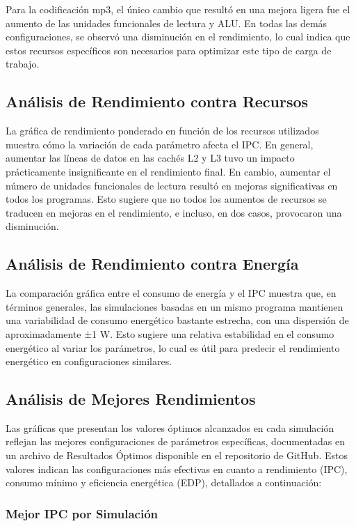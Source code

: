 \documentclass[conference]{IEEEtran}
\begin{document}
Para la codificación mp3, el único cambio que resultó en una mejora ligera fue el aumento de las unidades funcionales de lectura y ALU. En todas las demás configuraciones, se observó una disminución en el rendimiento, lo cual indica que estos recursos específicos son necesarios para optimizar este tipo de carga de trabajo.

\subsection{Análisis de Rendimiento contra Recursos}

La gráfica de rendimiento ponderado en función de los recursos utilizados muestra cómo la variación de cada parámetro afecta el IPC. En general, aumentar las líneas de datos en las cachés L2 y L3 tuvo un impacto prácticamente insignificante en el rendimiento final. En cambio, aumentar el número de unidades funcionales de lectura resultó en mejoras significativas en todos los programas. Esto sugiere que no todos los aumentos de recursos se traducen en mejoras en el rendimiento, e incluso, en dos casos, provocaron una disminución.

\subsection{Análisis de Rendimiento contra Energía}

La comparación gráfica entre el consumo de energía y el IPC muestra que, en términos generales, las simulaciones basadas en un mismo programa mantienen una variabilidad de consumo energético bastante estrecha, con una dispersión de aproximadamente ±1 W. Esto sugiere una relativa estabilidad en el consumo energético al variar los parámetros, lo cual es útil para predecir el rendimiento energético en configuraciones similares.

\subsection{Análisis de Mejores Rendimientos}

Las gráficas que presentan los valores óptimos alcanzados en cada simulación reflejan las mejores configuraciones de parámetros específicas, documentadas en un archivo de Resultados Óptimos disponible en el repositorio de GitHub. Estos valores indican las configuraciones más efectivas en cuanto a rendimiento (IPC), consumo mínimo y eficiencia energética (EDP), detallados a continuación:

\subsubsection{Mejor IPC por Simulación}
\end{document}
